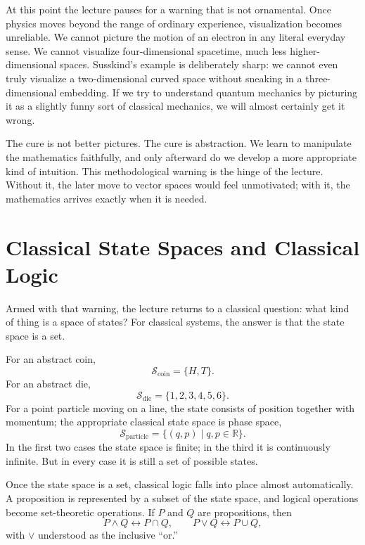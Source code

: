 At this point the lecture pauses for a warning that is not ornamental. Once physics moves beyond the range of ordinary experience, visualization becomes unreliable. We cannot picture the motion of an electron in any literal everyday sense. We cannot visualize four-dimensional spacetime, much less higher-dimensional spaces. Susskind's example is deliberately sharp: we cannot even truly visualize a two-dimensional curved space without sneaking in a three-dimensional embedding. If we try to understand quantum mechanics by picturing it as a slightly funny sort of classical mechanics, we will almost certainly get it wrong.

The cure is not better pictures. The cure is abstraction. We learn to manipulate the mathematics faithfully, and only afterward do we develop a more appropriate kind of intuition. This methodological warning is the hinge of the lecture. Without it, the later move to vector spaces would feel unmotivated; with it, the mathematics arrives exactly when it is needed.

\section{Classical State Spaces and Classical Logic}

Armed with that warning, the lecture returns to a classical question: what kind of thing is a space of states? For classical systems, the answer is that the state space is a set.

For an abstract coin,
\begin{equation}
\mathcal{S}_{\mathrm{coin}}=\{H,T\}.
\end{equation}
For an abstract die,
\begin{equation}
\mathcal{S}_{\mathrm{die}}=\{1,2,3,4,5,6\}.
\end{equation}
For a point particle moving on a line, the state consists of position together with momentum; the appropriate classical state space is phase space,
\begin{equation}
\mathcal{S}_{\mathrm{particle}}=\{(q,p)\mid q,p\in\mathbb{R}\}.
\end{equation}
In the first two cases the state space is finite; in the third it is continuously infinite. But in every case it is still a set of possible states.

Once the state space is a set, classical logic falls into place almost automatically. A proposition is represented by a subset of the state space, and logical operations become set-theoretic operations. If \(P\) and \(Q\) are propositions, then
\begin{equation}
P\wedge Q \leftrightarrow P\cap Q,
\qquad
P\vee Q \leftrightarrow P\cup Q,
\end{equation}
with \( \vee \) understood as the inclusive ``or.''

